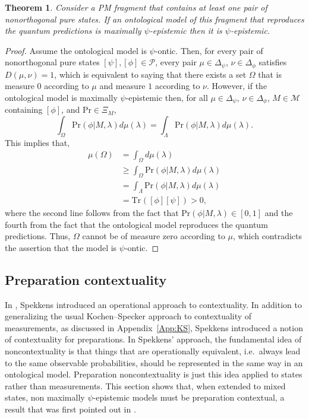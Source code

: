 \documentclass[DIV=calc,fontsize=12pt]{scrartcl} %
\theoremstyle{definition}
\theoremstyle{plain}
\newtheorem{theorem}[definition]{Theorem}
\newcommand{\Proj}[1]{\ensuremath{\left [ #1 \right ]}}
\newcommand{\Tr}[2][]{\ensuremath{\text{Tr}_{#1} \left ( #2 \right )}}
\begin{document}
\begin{theorem}
\label{thm:ME:MEPE}
Consider a PM fragment that contains at least one pair of
nonorthogonal pure states.  If an ontological model of this fragment
that reproduces the quantum predictions is maximally
$\psi$-epistemic then it is $\psi$-epistemic.
\end{theorem}
\begin{proof}
Assume the ontological model is $\psi$-ontic.  Then, for every pair
of nonorthogonal pure states $\Proj{\psi}, \Proj{\phi} \in
\mathcal{P}$, every pair $\mu \in \Delta_{\psi}$, $\nu \in
\Delta_{\phi}$ satisfies $D(\mu,\nu) = 1$, which is equivalent to
saying that there exists a set $\Omega$ that is measure $0$
according to $\mu$ and measure $1$ according to $\nu$.  However, if
the ontological model is maximally $\psi$-epistemic then, for all
$\mu \in \Delta_{\psi}$, $\nu \in \Delta_{\phi}$, $M \in
\mathcal{M}$ containing $\Proj{\phi}$, and $\text{Pr} \in \Xi_M$,
\begin{equation}
\int_{\Omega} \text{Pr}(\phi|M,\lambda) d\mu(\lambda) =
\int_{\Lambda} \text{Pr}(\phi|M,\lambda) d\mu(\lambda).
\end{equation}
This implies that,
\begin{align}
\mu(\Omega) & = \int_{\Omega} d\mu(\lambda) \\
& \geq \int_{\Omega}
\text{Pr}(\phi|M,\lambda) d \mu(\lambda) \\
& = \int_{\Lambda} \text{Pr}(\phi|M,\lambda) d \mu(\lambda) \\
& = \Tr{\Proj{\phi}\Proj{\psi}} > 0,
\end{align}
where the second line follows from the fact that
$\text{Pr}(\phi|M,\lambda) \in [0,1]$ and the fourth from the fact
that the ontological model reproduces the quantum predictions.
Thus, $\Omega$ cannot be of measure zero according to $\mu$, which
contradicts the assertion that the model is $\psi$-ontic.
\end{proof}

\subsection{Preparation contextuality}

\label{PC}

In \cite{Spekkens2005}, Spekkens introduced an operational approach to
contextuality.  In addition to generalizing the usual Kochen--Specker
approach to contextuality of measurements, as discussed in
Appendix~\ref{App:KS}, Spekkens introduced a notion of contextuality
for preparations.  In Spekkens' approach, the fundamental idea of
noncontextuality is that things that are operationally equivalent,
i.e.\ always lead to the same observable probabilities, should be
represented in the same way in an ontological model.  Preparation
noncontextuality is just this idea applied to states rather than
measurements.  This section shows that, when extended to mixed states,
non maximally $\psi$-epistemic models must be preparation contextual,
a result that was first pointed out in \cite{Leifer2013c}.
\end{document}

